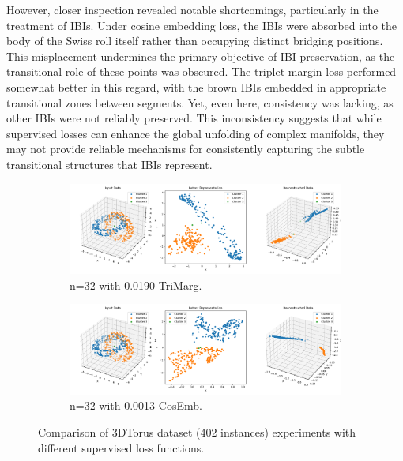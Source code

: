 However, closer inspection revealed notable shortcomings, particularly in the treatment of IBIs. Under cosine embedding loss, the IBIs were absorbed into the body of the Swiss roll itself rather than occupying distinct bridging positions. This misplacement undermines the primary objective of IBI preservation, as the transitional role of these points was obscured. The triplet margin loss performed somewhat better in this regard, with the brown IBIs embedded in appropriate transitional zones between segments. Yet, even here, consistency was lacking, as other IBIs were not reliably preserved. This inconsistency suggests that while supervised losses can enhance the global unfolding of complex manifolds, they may not provide reliable mechanisms for consistently capturing the subtle transitional structures that IBIs represent.

\begin{figure}[htbp]
  \centering
  \begin{subfigure}[b]{1.0\textwidth}
    \centering
    \includegraphics[width=\linewidth]{images/RQ3/tri/3DTorus_32_0.0190.png}
    \caption{n=32 with 0.0190 TriMarg.}
    \label{fig:RQ3/tri/3DTorus}
  \end{subfigure}
  \hfill
  \begin{subfigure}[b]{1.0\textwidth}
    \centering
    \includegraphics[width=\linewidth]{images/RQ3/cos/3DTorus_32_0.0013.png}
    \caption{n=32 with 0.0013 CosEmb.}
    \label{fig:RQ3/cos/3DTorus}
  \end{subfigure} 

  \caption{Comparison of 3DTorus dataset (402 instances) experiments with different
supervised loss functions.}
  \label{fig:RQ3/3DTorus}
\end{figure}

